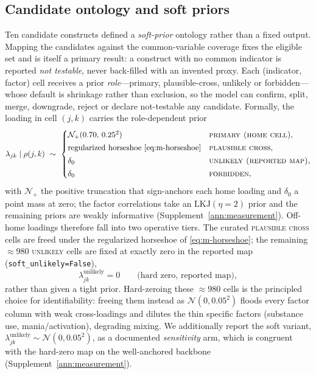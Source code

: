 \subsection{Candidate ontology and soft priors}

Ten candidate constructs defined a \emph{soft-prior} ontology rather than a fixed
output.
Mapping the candidates against the common-variable coverage fixes the eligible set and
is itself a primary result: a construct with no common indicator is reported
\emph{not testable}, never back-filled with an invented proxy. Each (indicator, factor)
cell receives a prior \emph{role}---primary, plausible-cross, unlikely or
forbidden---whose default is shrinkage rather than exclusion, so the model can confirm,
split, merge, downgrade, reject or declare not-testable any candidate. Formally, the
loading in cell $(j,k)$ carries the role-dependent prior
\begin{equation}
  \lambda_{jk}\mid\rho(j,k)\ \sim\
  \begin{cases}
    \mathcal{N}_{+}(0.70,\,0.25^2) & \textsc{primary (home cell)},\\[2pt]
    \text{regularized horseshoe }\eqref{eq:m-horseshoe} & \textsc{plausible cross},\\[2pt]
    \delta_{0}                     & \textsc{unlikely (reported map)},\\[2pt]
    \delta_{0}                     & \textsc{forbidden},
  \end{cases}
  \label{eq:m-softprior}
\end{equation}
with $\mathcal N_{+}$ the positive truncation that sign-anchors each home loading and
$\delta_0$ a point mass at zero; the factor correlations take an $\mathrm{LKJ}(\eta{=}2)$
prior and the remaining priors are weakly informative (Supplement~\ref{ann:measurement}).
Off-home loadings therefore fall into two operative tiers. The curated \textsc{plausible
cross} cells are freed under the regularized horseshoe of \eqref{eq:m-horseshoe}; the
remaining $\approx980$ \textsc{unlikely} cells are fixed at exactly zero in the reported
map (\texttt{soft\_unlikely=False}),
\[
  \lambda_{jk}^{\text{unlikely}} = 0 \qquad \text{(hard zero, reported map)},
\]
rather than given a tight prior. Hard-zeroing these $\approx980$ cells is the principled
choice for identifiability: freeing them instead as $\mathcal N(0,0.05^2)$ floods every
factor column with weak cross-loadings and dilutes the thin specific factors (substance
use, mania/activation), degrading mixing. We additionally report the soft variant,
$\lambda_{jk}^{\text{unlikely}}\sim\mathcal N(0,0.05^2)$, as a documented
\emph{sensitivity} arm, which is congruent with the hard-zero map on the well-anchored
backbone (Supplement~\ref{ann:measurement}).

